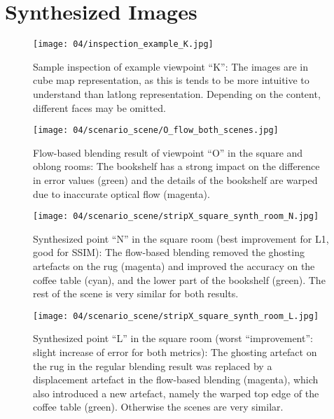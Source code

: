 \chapter{Synthesized Images}\label{imgs}

\begin{figure}
		\centering
		\texttt{[image: 04/inspection\_example\_K.jpg]}
		\caption[Sample inspection of viewpoint ``K'']{Sample inspection of example viewpoint ``K'': The images are in cube map representation, as this is tends to be more intuitive to understand than latlong representation. Depending on the content, different faces may be omitted.}
		\label{fig:inspection_example}
\end{figure}

\begin{figure}
		\centering
    \texttt{[image: 04/scenario\_scene/O\_flow\_both\_scenes.jpg]}
		\caption[Flow-based blending results of ``O'']{Flow-based blending result of viewpoint ``O'' in the square and oblong rooms: The bookshelf has a strong impact on the difference in error values (green) and the details of the bookshelf are warped due to inaccurate optical flow (magenta).}
		\label{fig:scene_O_flow}
\end{figure}

\begin{figure}
  \centering
  \texttt{[image: 04/scenario\_scene/stripX\_square\_synth\_room\_N.jpg]}
  \caption[Viewpoint ``N'' in the square room]{Synthesized point ``N'' in the square room (best improvement for L1, good for SSIM): The flow-based blending removed the ghosting artefacts on the rug (magenta) and improved the accuracy on the coffee table (cyan), and the lower part of the bookshelf (green). The rest of the scene is very similar for both results.}
  \label{fig:scene_square_N}
\end{figure}

\begin{figure}
  \centering
  \texttt{[image: 04/scenario\_scene/stripX\_square\_synth\_room\_L.jpg]}
  \caption[Viewpoint ``L'' in the square room]{Synthesized point ``L'' in the square room (worst ``improvement'': slight increase of error for both metrics): The ghosting artefact on the rug in the regular blending result was replaced by a displacement artefact in the flow-based blending (magenta), which also introduced a new artefact, namely the warped top edge of the coffee table (green). Otherwise the scenes are very similar.}
  \label{fig:scene_square_L}
\end{figure}

